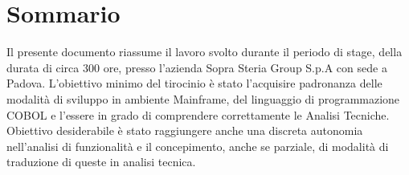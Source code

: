 
\cleardoublepage
{}
{}
\begingroup
\let\clearpage\relax
\let\cleardoublepage\relax
\let\cleardoublepage\relax

\chapter*{Sommario}

Il presente documento riassume il lavoro svolto durante il periodo di stage, della durata di circa 300 ore, presso l’azienda Sopra Steria Group S.p.A con sede a Padova.
L'obiettivo minimo del tirocinio è stato l'acquisire padronanza delle modalità di sviluppo in ambiente Mainframe, del linguaggio di programmazione COBOL e l'essere in grado di comprendere correttamente le Analisi Tecniche.
Obiettivo desiderabile è stato raggiungere anche una discreta autonomia nell'analisi di funzionalità e il concepimento, anche se parziale, di modalità di traduzione di queste in analisi tecnica.

%
%

\endgroup			

\vfill

